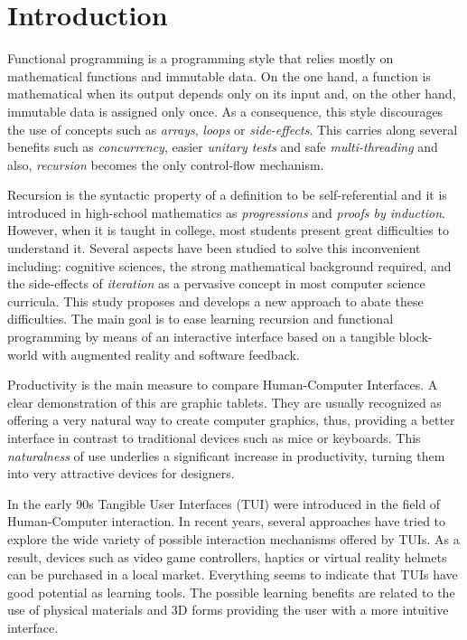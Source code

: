 \section{Introduction}

Functional programming is a programming style that relies mostly on
mathematical functions and immutable data. On the one hand, a function
is mathematical when its output depends only on its input and, on the
other hand, immutable data is assigned only once. As a consequence,
this style discourages the use of concepts such as \emph{arrays},
\emph{loops} or \emph{side\hyp{}effects}. This carries along several
benefits such as \emph{concurrency}, easier \emph{unitary tests} and
safe \emph{multi\hyp{}threading} and also, \emph{recursion} becomes
the only control\hyp{}flow mechanism.

Recursion is the syntactic property of a definition to be
self\hyp{}referential and it is introduced in high\hyp{}school
mathematics as \emph{progressions} and \emph{proofs by induction}.
However, when it is taught in college, most students present great
difficulties to understand it. Several aspects have been studied to
solve this inconvenient including: cognitive sciences, the strong
mathematical background required, and the side\hyp{}effects of
\emph{iteration} as a pervasive concept in most computer science
curricula. This study proposes and develops a new approach to abate
these difficulties. The main goal is to ease learning recursion and
functional programming by means of an interactive interface based on a
tangible block\hyp{}world with augmented reality and software
feedback.

Productivity is the main measure to compare Human\hyp{}Computer
Interfaces. A clear demonstration of this are graphic tablets. They
are usually recognized as offering a very natural way to create
computer graphics, thus, providing a better interface in contrast to
traditional devices such as mice or keyboards. This \emph{naturalness}
of use underlies a significant increase in productivity, turning them
into very attractive devices for designers.

In the early 90s Tangible User Interfaces (TUI) were introduced in
the field of Human\hyp{}Computer interaction. In recent years,
several approaches have tried to explore the wide variety of possible
interaction mechanisms offered by TUIs. As a result, devices such as
video game controllers, haptics or virtual reality helmets can be
purchased in a local market. Everything seems to indicate that TUIs
have good potential as learning tools. The possible learning benefits
are related to the use of physical materials and 3D forms providing
the user with a more intuitive interface.

